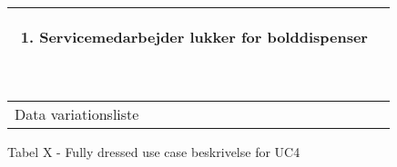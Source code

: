\documentclass[]{article}
\begin{document}
\begin{longtable}[]{@{}ll@{}}
\begin{minipage}[t]{0.47\columnwidth}
{\begin{enumerate}
\item
  {Servicemedarbejder lukker for bolddispenser}
\end{enumerate}\
}\strut
\end{minipage}\tabularnewline
\toprule
\begin{minipage}[t]{0.47\columnwidth}\raggedright
{Data variationsliste}\strut
\end{minipage} & \begin{minipage}[t]{0.47\columnwidth}\raggedright
{}\strut
\end{minipage}\tabularnewline
\bottomrule
\bottomrule
\end{longtable}

{Tabel X - Fully dressed use case beskrivelse for UC4}

{}
\end{document}
